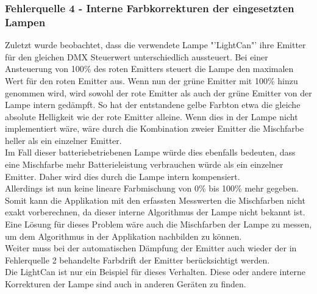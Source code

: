 \documentclass[11pt]{scrartcl}
\begin{document}
\subsubsection{Fehlerquelle 4 - Interne Farbkorrekturen der eingesetzten Lampen}
Zuletzt wurde beobachtet, dass die verwendete Lampe "'LightCan"' ihre Emitter für den gleichen DMX
Steuerwert unterschiedlich aussteuert. Bei einer Ansteuerung von 100\% des roten Emitters steuert die Lampe den
maximalen Wert für den roten Emitter aus. Wenn nun der grüne Emitter mit 100\% hinzu genommen wird, wird sowohl der rote Emitter
als auch der grüne Emitter von der Lampe intern gedämpft. So hat der entstandene gelbe Farbton etwa die gleiche absolute
Helligkeit wie der rote Emitter alleine. Wenn dies in der Lampe nicht implementiert wäre, wäre durch die Kombination zweier
Emitter die Mischfarbe heller als ein einzelner Emitter.\\
Im Fall dieser batteriebetriebenen Lampe würde dies ebenfalls bedeuten, dass eine Mischfarbe mehr Batterieleistung verbrauchen
würde als ein einzelner Emitter. Daher wird dies durch die Lampe intern kompensiert.\\
Allerdings ist nun keine lineare Farbmischung von 0\% bis 100\% mehr gegeben. Somit kann die Applikation mit den erfassten
Messwerten die Mischfarben nicht exakt vorberechnen, da dieser interne Algorithmus der Lampe nicht bekannt ist.\\
Eine Lösung für dieses Problem wäre auch die Mischfarben der Lampe zu messen, um dem Algorithmus in der Applikation nachbilden
zu können.\\
Weiter muss bei der automatischen Dämpfung der Emitter auch wieder der in Fehlerquelle 2 behandelte Farbdrift der Emitter
berücksichtigt werden.\\
Die LightCan ist nur ein Beispiel für dieses Verhalten. Diese oder andere interne Korrekturen der Lampe sind auch in anderen
Geräten zu finden.
\clearpage

\end{document}
